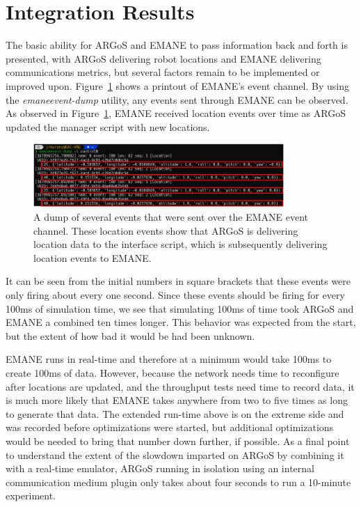 \section{Integration Results}
The basic ability for ARGoS and EMANE to pass information back and forth is presented, with ARGoS delivering robot locations and EMANE delivering communications metrics, but several factors remain to be implemented or improved upon.
Figure~\ref{emane_locs} shows a printout of EMANE's event channel.
By using the \textit{emaneevent-dump} utility, any events sent through EMANE can be observed.
As observed in Figure~\ref{emane_locs}, EMANE received location events over time as ARGoS updated the manager script with new locations.
\begin{figure}[!ht]
    \centering
    \includegraphics[width=0.85\textwidth,keepaspectratio]{Images/Chpt5/ARGoS_Events_EMANE_annotated.png}
    \caption{A dump of several events that were sent over the EMANE event channel. These location events show that ARGoS is delivering location data to the interface script, which is subsequently delivering location events to EMANE.}
    \label{emane_locs}
\end{figure}
It can be seen from the initial numbers in square brackets that these events were only firing about every one second.
Since these events should be firing for every 100ms of simulation time, we see that simulating 100ms of time took ARGoS and EMANE a combined ten times longer.
This behavior was expected from the start, but the extent of how bad it would be had been unknown.\par
EMANE runs in real-time and therefore at a minimum would take 100ms to create 100ms of data.
However, because the network needs time to reconfigure after locations are updated, and the throughput tests need time to record data, it is much more likely that EMANE takes anywhere from two to five times as long to generate that data.
The extended run-time above is on the extreme side and was recorded before optimizations were started, but additional optimizations would be needed to bring that number down further, if possible.
As a final point to understand the extent of the slowdown imparted on ARGoS by combining it with a real-time emulator, ARGoS running in isolation using an internal communication medium plugin only takes about four seconds to run a 10-minute experiment.
